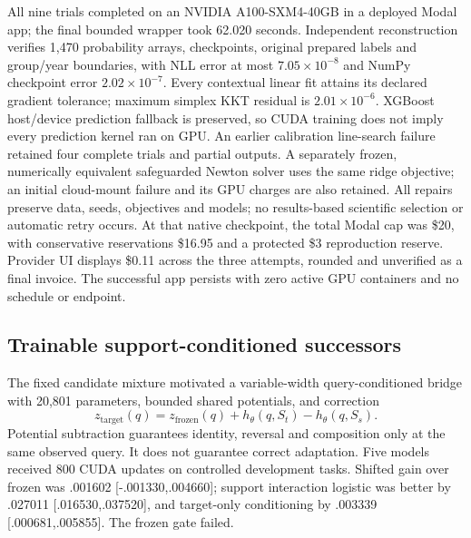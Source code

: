 \documentclass[10pt]{article}
\begin{document}
All nine trials completed on an NVIDIA A100-SXM4-40GB in a deployed Modal app; the final bounded wrapper took 62.020 seconds. Independent reconstruction verifies 1,470 probability arrays, checkpoints, original prepared labels and group/year boundaries, with NLL error at most $7.05\times10^{-8}$ and NumPy checkpoint error $2.02\times10^{-7}$. Every contextual linear fit attains its declared gradient tolerance; maximum simplex KKT residual is $2.01\times10^{-6}$. XGBoost host/device prediction fallback is preserved, so CUDA training does not imply every prediction kernel ran on GPU. An earlier calibration line-search failure retained four complete trials and partial outputs. A separately frozen, numerically equivalent safeguarded Newton solver uses the same ridge objective; an initial cloud-mount failure and its GPU charges are also retained. All repairs preserve data, seeds, objectives and models; no results-based scientific selection or automatic retry occurs. At that native checkpoint, the total Modal cap was \$20, with conservative reservations \$16.95 and a protected \$3 reproduction reserve. Provider UI displays \$0.11 across the three attempts, rounded and unverified as a final invoice. The successful app persists with zero active GPU containers and no schedule or endpoint.


\subsection{Trainable support-conditioned successors}
The fixed candidate mixture motivated a variable-width query-conditioned bridge with 20,801 parameters, bounded shared potentials, and correction
\begin{equation}
 z_{\mathrm{target}}(q)=z_{\mathrm{frozen}}(q)+h_{\theta}(q,S_t)-h_{\theta}(q,S_s).
\end{equation}
Potential subtraction guarantees identity, reversal and composition only at the same observed query. It does not guarantee correct adaptation. Five models received 800 CUDA updates on controlled development tasks. Shifted gain over frozen was .001602 [-.001330,.004660]; support interaction logistic was better by .027011 [.016530,.037520], and target-only conditioning by .003339 [.000681,.005855]. The frozen gate failed.
\end{document}
